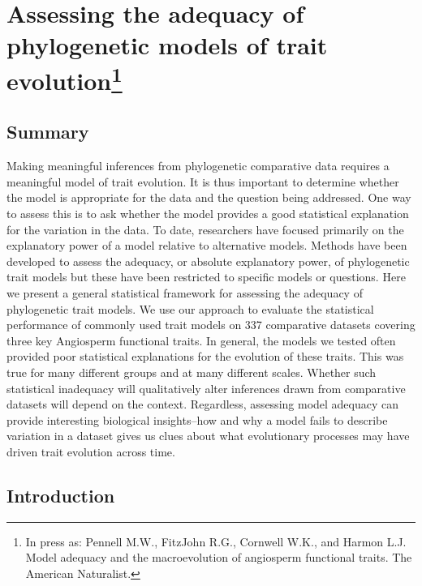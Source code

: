 \chapter[Assessing the adequacy of phylogenetic models of trait evolution]{Assessing the adequacy of phylogenetic models of trait evolution\footnote {In press as: Pennell M.W., FitzJohn R.G., Cornwell W.K., and Harmon L.J.
  Model adequacy and the macroevolution of angiosperm functional traits.
  The American Naturalist.}}
\label{chap:modeladequacy}

\section{Summary}
Making meaningful inferences from phylogenetic comparative data requires a meaningful model of trait evolution. It is thus important to determine whether the model is appropriate for the data and the question being addressed. One way to assess this is to ask whether the model provides a good statistical explanation for the variation in the data. To date, researchers have focused primarily on the explanatory power of a model relative to alternative models. Methods have been developed to assess the adequacy, or absolute explanatory power, of phylogenetic trait models but these have been restricted to specific models or questions. Here we present a general statistical framework for assessing the adequacy of phylogenetic trait models. We use our approach to evaluate the statistical performance of commonly used trait models on 337 comparative datasets covering three key Angiosperm functional traits. In general, the models we tested often provided poor statistical explanations for the evolution of these traits. This was true for many different groups and at many different scales. Whether such statistical inadequacy will qualitatively alter inferences drawn from comparative datasets will depend on the context. Regardless, assessing model adequacy can provide interesting biological insights--how and why a model fails to describe variation in a dataset gives us clues about what evolutionary processes may have driven trait evolution across time.

\section{Introduction}

